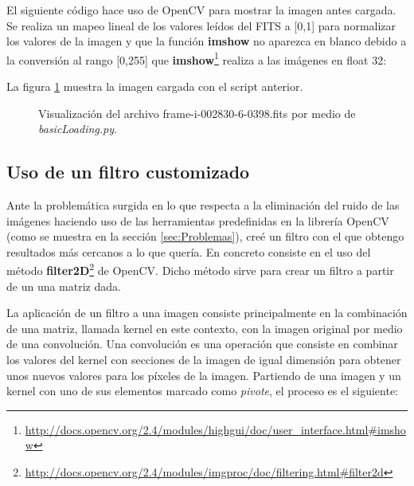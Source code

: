\documentclass[a4paper,12pt]{article}
\begin{document}
El siguiente código hace uso de OpenCV para mostrar la imagen antes cargada. Se realiza un mapeo lineal de los valores leídos del FITS a [0,1] para normalizar los valores de la imagen y que la función \textbf{imshow} no aparezca en blanco debido a la conversión al rango [0,255] que \textbf{imshow}\footnote{\url{http://docs.opencv.org/2.4/modules/highgui/doc/user_interface.html#imshow}} realiza a las imágenes en float 32:



La figura \ref{fig:img1} muestra la imagen cargada con el script anterior.
\begin{figure}[h!]
\centering
{}
\caption{Visualización del archivo frame-i-002830-6-0398.fits por medio de \textit{basicLoading.py}.}
\label{fig:img1}
\end{figure}

\subsection{Uso de un filtro customizado}

Ante la problemática surgida en lo que respecta a la eliminación del ruido de las imágenes haciendo uso de las herramientas predefinidas en la librería OpenCV (como se muestra en la sección \ref{sec:Problemas}), creé un filtro con el que obtengo resultados más cercanos a lo que quería. En concreto consiste en el uso del método \textbf{filter2D}\footnote{\url{http://docs.opencv.org/2.4/modules/imgproc/doc/filtering.html#filter2d}} de OpenCV. Dicho método sirve para crear un filtro a partir de un una matriz dada.

La aplicación de un filtro a una imagen consiste principalmente en la combinación de una matriz, llamada kernel en este contexto, con la imagen original por medio de una convolución. Una convolución es una operación que consiste en combinar los valores del kernel con secciones de la imagen de igual dimensión para obtener unos nuevos valores para los píxeles de la imagen. Partiendo de una imagen y un kernel con uno de sus elementos marcado como \textit{pivote}, el proceso es el siguiente:
\end{document}
